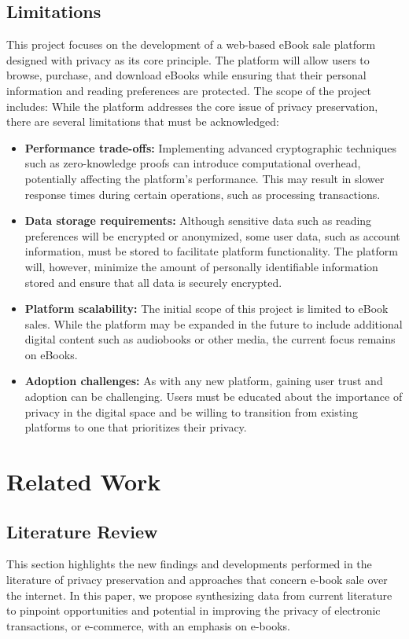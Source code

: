 \documentclass[12pt]{article}
\begin{document}
\subsection{Limitations}
This project focuses on the development of a web-based eBook sale platform designed with privacy as its core principle. The platform will allow users to browse, purchase, and download eBooks while ensuring that their personal information and reading preferences are protected. The scope of the project includes:
While the platform addresses the core issue of privacy preservation, there are several limitations that must be acknowledged:
\begin{itemize}
	\item \textbf{	Performance trade-offs: }Implementing advanced cryptographic techniques such as zero-knowledge proofs can introduce computational overhead, potentially affecting the platform’s performance. This may result in slower response times during certain operations, such as processing transactions.
	\item \textbf{	Data storage requirements: }Although sensitive data such as reading preferences will be encrypted or anonymized, some user data, such as account information, must be stored to facilitate platform functionality. The platform will, however, minimize the amount of personally identifiable information stored and ensure that all data is securely encrypted.
	\item \textbf{	Platform scalability: }The initial scope of this project is limited to eBook sales. While the platform may be expanded in the future to include additional digital content such as audiobooks or other media, the current focus remains on eBooks.
	\item \textbf{	Adoption challenges: }As with any new platform, gaining user trust and adoption can be challenging. Users must be educated about the importance of privacy in the digital space and be willing to transition from existing platforms to one that prioritizes their privacy.
	
	
\end{itemize}
\pagebreak
\section{Related Work}
\subsection{Literature Review }
This section highlights the new findings and developments performed in the literature of privacy preservation and approaches that concern e-book sale over the internet. In this paper, we propose synthesizing data from current literature to pinpoint opportunities and potential in improving the privacy of electronic transactions, or e-commerce, with an emphasis on e-books. \\
\end{document}
